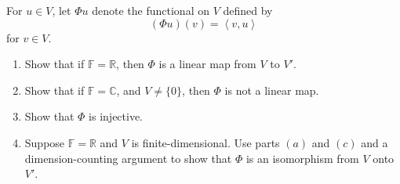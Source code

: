 \documentclass[12pt, letterpaper]{hmcpset}
\begin{document}
\pagebreak

\begin{problem}[17.]
	For $u \in V$, let $\Phi u$ denote the functional on $V$ defined by
	\[
		(\Phi u)(v) = \left < v, u \right >
	\]
	for $v \in V$.
	\begin{enumerate}
		\item
			Show that if $\mathbb F = \mathbb R$, then $\Phi$ is a linear map from $V$ to $V'$.
		\item
			Show that if $\mathbb F = \mathbb C$, and $V \neq \{ 0 \}$, then $\Phi$ is not a linear map.
		\item
			Show that $\Phi$ is injective.
		\item
			Suppose $\mathbb F = \mathbb R$ and $V$ is finite-dimensional. Use parts $(a)$ and $(c)$ and a dimension-counting argument to show that $\Phi$ is an isomorphism from $V$ onto $V'$.
	\end{enumerate}
\end{problem}
\end{document}
